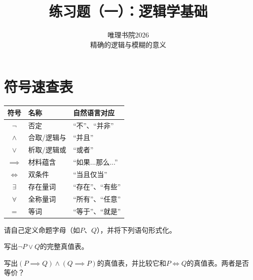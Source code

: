 \documentclass{quiz}
\title{\textbf{练习题（一）：逻辑学基础}}%
\author{唯理书院2026\\精确的逻辑与模糊的意义}
\date{}
\begin{document}
\maketitle


\vspace{5ex}
\section*{\centering 符号速查表}

  \begin{center}
  \begin{tabular}{cll}
    \textbf{符号} & \textbf{名称} & \textbf{自然语言对应} \\\midrule
    $\neg$ & 否定 & “不”、“并非” \\
    $\land$ & 合取/逻辑与 & “并且” \\
    $\lor$ & 析取/逻辑或 & “或者” \\
    $\implies$ & 材料蕴含 & “如果...那么...” \\
    $\iff$ & 双条件 & “当且仅当” \\
    $\exists$ & 存在量词 & “存在”、“有些” \\
    $\forall$ & 全称量词 & “所有”、“任意” \\
    $=$ & 等词 & “等于”、“就是” \\
  \end{tabular}
  \end{center}



\clearpage
{}

\begin{questions}

  \question 请自己定义命题字母（如$P$、$Q$），并将下列语句形式化。
  \vspace{3in}
  
  \question 写出$\neg P \lor Q$的完整真值表。
  \vspace{2in}
  
  \question 写出$(P \implies Q) \land (Q \implies P)$的真值表，并比较它和$P \iff Q$的真值表。两者是否等价？
  
\end{questions}
\end{document}
